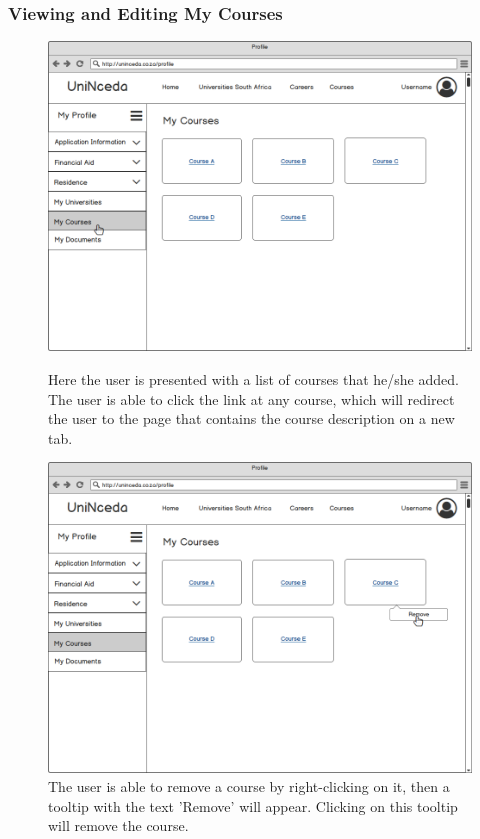 \documentclass[a4paper, 12pt]{article}
\begin{document}
\subsubsection{Viewing and Editing My Courses}

\setcounter{figure}{0}

\begin{figure}[H]
\centering
\includegraphics[scale=0.35]{ProfileMyCourses}
\caption{Here the user is presented with a list of courses that he/she added. The user is able to click the link at any course, which will redirect the user to the page that contains the course description on a new tab.}
\label{ProfileMyCourses}


\vspace{1cm}

\includegraphics[scale=0.35]{ProfileMyCoursesRemoveCourse}
\caption{The user is able to remove a course by right-clicking on it, then a tooltip with the text 'Remove' will appear. Clicking on this tooltip will remove the course.}
\label{ProfileMyCoursesRemoveCourse}


\end{figure}
\end{document}
